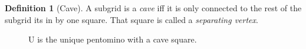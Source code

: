 \documentclass{article}
\theoremstyle{definition}%
\newtheorem{definition}[theorem]{Definition}
\newtheorem{example}[theorem]{Example}
\newcommand{\newterm}[1]{\textit{#1}}
\newcommand{\adj}{\operatorname{adj}}
\newcommand{\border}{\operatorname{border}}
\newcommand{\bound}{\operatorname{bound}}
\newcommand{\outside}{\operatorname{outside}}
\begin{document}
%
\begin{definition}[Cave]
A subgrid is a \newterm{cave} iff it is only connected to the rest of the subgrid its in by one square. That square is called a \newterm{separating vertex}. \cite{enwiki:separatingvertex}
\end{definition}
%
%
\begin{figure}
    \centering
    \caption{U is the unique pentomino with a cave square.}
    \label{fig:ucave}
\end{figure}
%
\end{document}
